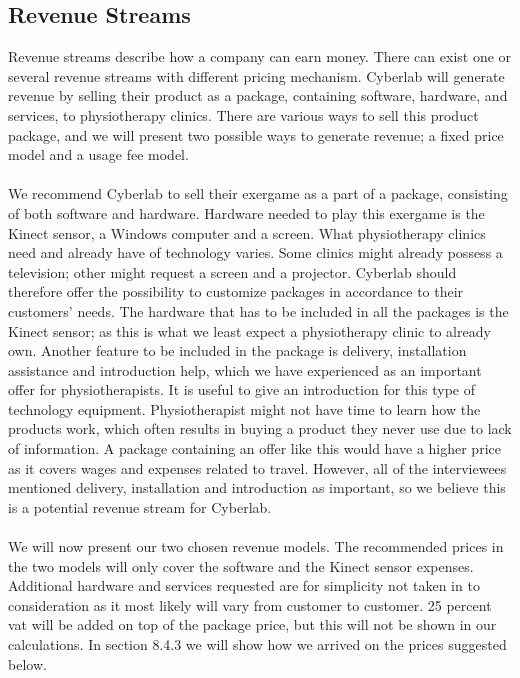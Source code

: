 \subsection{Revenue Streams}
Revenue streams describe how a company can earn money. There can exist one or several revenue streams with different pricing mechanism. Cyberlab will generate revenue by selling their product as a package, containing software, hardware, and services, to physiotherapy clinics. There are various ways to sell this product package, and we will present two possible ways to generate revenue; a fixed price model and a usage fee model. \\ \\ 
We recommend Cyberlab to sell their exergame as a part of a package, consisting of both software and hardware. Hardware needed to play this exergame is the Kinect sensor, a Windows computer and a screen. What physiotherapy clinics need and already have of technology varies. Some clinics might already possess a television; other might request a screen and a projector. Cyberlab should therefore offer the possibility to customize packages in accordance to their customers' needs. The hardware that has to be included in all the packages is the Kinect sensor; as this is what we least expect a physiotherapy clinic to already own. Another feature to be included in the package is delivery, installation assistance and introduction help, which we have experienced as an important offer for physiotherapists. It is useful to give an introduction for this type of technology equipment. Physiotherapist might not have time to learn how the products work, which often results in buying a product they never use due to lack of information. A package containing an offer like this would have a higher price as it covers wages and expenses related to travel. However, all of the interviewees mentioned delivery, installation and introduction as important, so we believe this is a potential revenue stream for Cyberlab. \\ \\ 
We will now present our two chosen revenue models. The recommended prices in the two models will only cover the software and the Kinect sensor expenses. Additional hardware and services requested are for simplicity not taken in to consideration as it most likely will vary from customer to customer. 25 percent \ac{vat} will be added on top of the package price, but this will not be shown in our calculations. In section 8.4.3 we will show how we arrived on the prices suggested below.\\ \\
